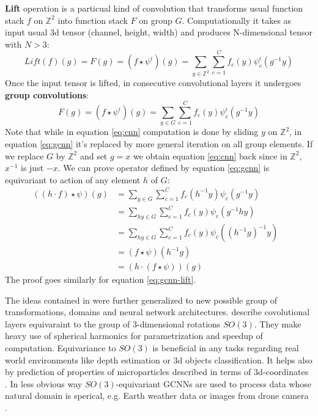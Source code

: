     \textbf{Lift} operation is a particual kind of convolution
    that transforms usual function stack $f$ on $\mathbb{Z}^2$ into
    function stack $F$ on group $G$. Computationally it takes as input
    usual 3d tensor (channel, height, width) and produces
    N-dimensional tensor with $N>3$:
    \begin{equation}
        \label{eq:gcnn-lift}
        \mathit{Lift}(f)(g) = F(g) = (f\star\psi^i)(g) = \sum_{y\in \mathbb{Z}^2}\sum_{c=1}^C
        f_c(y)\psi_{c}^{i}(g^{-1}y)
    \end{equation}
    Once the input tensor is lifted, in consecutive convolutional layers it
    undergoes \textbf{group convolutions}:
    \begin{equation}
        \label{eq:gcnn}
        F(g) = (f\star\psi^i)(g) = \sum_{y\in G}\sum_{c=1}^C
        f_c(y)\psi_{c}^{i}(g^{-1}y)
    \end{equation}
    Note that while in equation \ref{eq:cnn} computation is done by sliding
    $y$ on $\mathbb{Z}^2$, in equation \ref{eq:gcnn} it's replaced by more
    general iteration on all group elements. If we replace $G$ by $\mathbb{Z}^2$
    and set $g=x$ we obtain equation \ref{eq:cnn} back since in $\mathbb{Z}^2$,
    $x^{-1}$ is just $-x$. We can prove operator defined by equation
    \ref{eq:gcnn} is equivariant to action of any element $h$ of $G$:
    \begin{align*}
        ((h\cdot f)\star\psi)(g) & =
        \sum_{y\in G}\sum_{c=1}^C f_c(h^{-1}y)\psi_{c}(g^{-1}y)\\
        & = \sum_{hy\in G}\sum_{c=1}^C f_c(y)\psi_{c}(g^{-1}hy)\\
        & = \sum_{hy\in G}\sum_{c=1}^C f_c(y)\psi_{c}((h^{-1}g)^{-1}y)\\
        & = (f\star\psi)(h^{-1}g) &  \\
        & = (h\cdot(f\star\psi))(g)
    \end{align*}
    The proof goes similarly for equation \ref{eq:gcnn-lift}.

    The ideas contained in \cite{cohen2016} were further generalized to new
    possible group of transformations, domains and neural network
    architectures. \cite{cohen_spherical_cnns, kondor_trivedi,
    esteves_so3} describe covolutional layers equivaraint to
    the group of 3-dimensional rotations $\mathit{SO}(3)$.
    They make heavy use of spherical harmonics for parametrization and
    speedup of computation. Equivariance to $\mathit{SO}(3)$ is beneficial 
    in any tasks regarding real world environments like depth estimation or 3d
    objects classification\cite{esteves_so3}. It helps also by
    prediction of properties of
    microparticles described in terms of 3d-coordinates \cite{lieconv}.
    In less obvious way
    $\mathit{SO}(3)$-equivariant GCNNs are used to process data whose natural
    domain is sperical, e.g. Earth weather data or images from drone camera
    \cite{cohen_spherical_cnns}.

